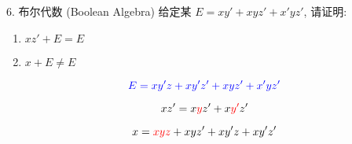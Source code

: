 \begin{frame}{}
  \begin{exampleblock}{$6.$ 布尔代数 (Boolean Algebra)}
    给定某 $E = xy' + xyz' + x'yz'$, 请证明:
    \begin{enumerate}[(1)]
      \item $xz' + E = E$
      \item $x + E \neq E$
    \end{enumerate}
  \end{exampleblock}

  \pause
  \vspace{-0.40cm}

  \pause
  \vspace{-0.80cm}
  \[
    \textcolor{blue}{E = xy'z + xy'z' + xyz' + x'yz'}
  \]

  \pause
  \vspace{-0.50cm}
  \[
    xz' = x\textcolor{red}{y}z' + x\textcolor{red}{y'}z'
  \]

  \pause
  \vspace{-0.50cm}
  \[
    x = \textcolor{red}{xyz} + xyz' + xy'z + xy'z'
  \]
\end{frame}
